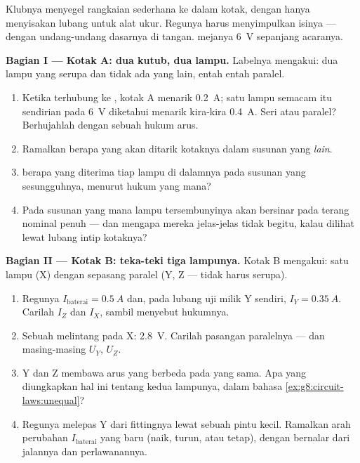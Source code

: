 \begin{problem}\label{pb:g8:circuit-laws:1}
Klubnya menyegel rangkaian sederhana ke dalam kotak, dengan hanya
menyisakan lubang untuk alat ukur. Regunya harus menyimpulkan isinya
--- dengan undang-undang dasarnya di tangan.  mejanya
\qty{6}{V} sepanjang acaranya.

\medskip\noindent\textbf{Bagian I --- Kotak A: dua kutub, dua
lampu.}
Labelnya mengakui: dua lampu yang serupa dan tidak ada yang lain,
entah  entah paralel.
\begin{enumerate}
  \item Ketika terhubung ke , kotak A menarik \qty{0.2}{A};
        satu lampu semacam itu sendirian pada \qty{6}{V} diketahui
        menarik kira-kira \qty{0.4}{A}. Seri atau paralel?
        Berhujahlah dengan sebuah hukum arus.
  \item Ramalkan berapa yang akan ditarik kotaknya dalam susunan yang
        \emph{lain}.
  \item {} berapa yang diterima tiap lampu di dalamnya pada
        susunan yang sesungguhnya, menurut hukum  yang mana?
  \item Pada susunan yang mana lampu tersembunyinya akan bersinar
        pada terang nominal penuh --- dan mengapa mereka jelas-jelas
        tidak begitu, kalau dilihat lewat lubang intip kotaknya?
\end{enumerate}

\medskip\noindent\textbf{Bagian II --- Kotak B: teka-teki
tiga lampunya.}
Kotak B mengakui: satu lampu (X)  dengan sepasang 
paralel (Y, Z --- tidak harus serupa).
\begin{enumerate}[resume]
  \item Regunya  $I_{\text{baterai}} = \qty{0.5}{A}$
        dan, pada lubang uji milik Y sendiri, $I_Y = \qty{0.35}{A}$.
        Carilah $I_Z$ dan $I_X$, sambil menyebut hukumnya.
  \item Sebuah  melintang pada X: \qty{2.8}{V}. Carilah
         pasangan paralelnya --- dan masing-masing $U_Y$, $U_Z$.
  \item Y dan Z membawa arus yang berbeda pada  yang sama. Apa
        yang diungkapkan hal ini tentang kedua lampunya, dalam bahasa
        \cref{ex:g8:circuit-laws:unequal}?
  \item Regunya melepas Y dari fittingnya lewat sebuah pintu kecil.
        Ramalkan arah perubahan $I_{\text{baterai}}$ yang baru (naik,
        turun, atau tetap), dengan bernalar dari jalannya dan
        perlawanannya.
\end{enumerate}


\end{problem}
